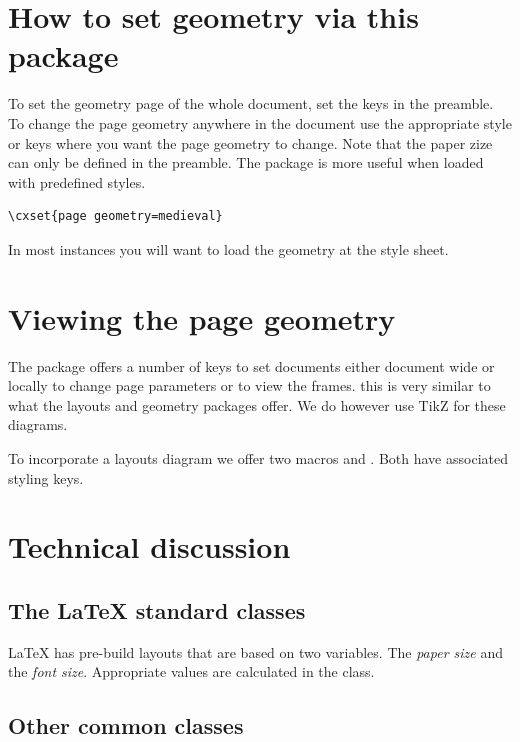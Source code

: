 \section{How to set geometry via this package}

To set the geometry page of the whole document, set the keys in the preamble. To change the page geometry anywhere in the document use the appropriate style or keys where you want the page geometry to change.
Note that the paper zize can only be defined in the preamble. The package is more useful when loaded with predefined styles.

\begin{tcolorbox}
\begin{lstlisting}
\cxset{page geometry=medieval}
\end{lstlisting}
\end{tcolorbox}

In most instances you will want to load the geometry at the style sheet.


\section{Viewing the page geometry}

The package offers a number of keys to set documents either document wide or locally to change page 
parameters or to view the frames. this is very similar to what the layouts and geometry packages offer. We do
however use TikZ for these diagrams.

To incorporate a layouts diagram we offer two macros  and . Both have associated styling keys.
\medskip

\section{Technical discussion}
\subsection{The LaTeX standard classes}

LaTeX has pre-build layouts that are based on two variables. The \textit{paper size} and the \textit{font size}. Appropriate values are calculated in the class.

\subsection{Other common classes}

